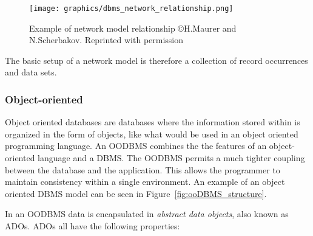 \documentclass[letterpaper, 12pt]{article}
\begin{document}
\begin{figure}[H]
  \centering
  \texttt{[image: graphics/dbms\_network\_relationship.png]}
  \caption{Example of network model relationship \copyright H.Maurer \newline and N.Scherbakov. Reprinted with permission \cite{network_model_coronet}}
  \label{fig:networkDBMS_relationship}
\end{figure}

The basic setup of a network model is therefore a collection of record occurrences and
data sets.

\subsubsection{Object-oriented}
Object oriented databases are databases where the information stored within is organized
in the form of objects, like what would be used in an object oriented programming
language. An OODBMS combines the the features of an object-oriented language and a
DBMS. The OODBMS permits a much tighter coupling between the database and the application. 
This allows the programmer to maintain consistency within a single environment. An example 
of an object oriented DBMS model can be seen in Figure~\ref{fig:ooDBMS_structure}.

\par\vspace{\baselineskip}
In an OODBMS data is encapsulated in \textit{abstract data objects}, also known
as ADOs. ADOs all have the following properties:
\end{document}
